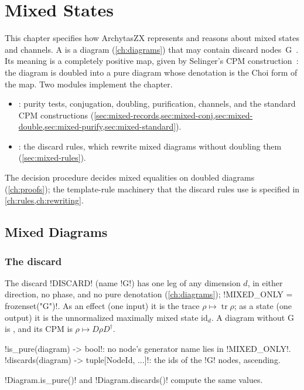 \chapter{Mixed States}\label{ch:mixed}

This chapter specifies how ArchytasZX represents and reasons about mixed states and channels. A  is a diagram (\cref{ch:diagrams}) that may contain discard nodes~G~\cite{carette2019mixed}. Its meaning is a completely positive map, given by Selinger's CPM construction~\cite{selinger2007cpm}: the diagram is doubled into a pure diagram whose denotation is the Choi form of the map. Two modules implement the chapter.
\begin{itemize}
\item {}: purity tests, conjugation, doubling, purification, channels, and the standard CPM constructions (\cref{sec:mixed-records,sec:mixed-conj,sec:mixed-double,sec:mixed-purify,sec:mixed-standard}).
\item {}: the discard rules, which rewrite mixed diagrams without doubling them (\cref{sec:mixed-rules}).
\end{itemize}
The decision procedure decides mixed equalities on doubled diagrams (\cref{ch:proofs}); the template-rule machinery that the discard rules use is specified in \cref{ch:rules,ch:rewriting}.

\section{Mixed Diagrams}\label{sec:mixed-records}

\subsection{The discard}

The discard \py!DISCARD! (name \code!G!) has one leg of any dimension $d$, in either direction, no phase, and no pure denotation (\cref{ch:diagrams}); \py!MIXED_ONLY = frozenset({"G"})!. As an effect (one input) it is the trace $\rho\mapsto\operatorname{tr}\rho$; as a state (one output) it is the unnormalized maximally mixed state $\mathrm{id}_d$. A diagram without G is , and its CPM is $\rho\mapsto D\rho D^\dagger$.

\begin{signature}
\py!is_pure(diagram) -> bool!: no node's generator name lies in \py!MIXED_ONLY!.\\
\py!discards(diagram) -> tuple[NodeId, ...]!: the ids of the \code!G! nodes, ascending.
\end{signature}
\py!Diagram.is_pure()! and \py!Diagram.discards()! compute the same values.


